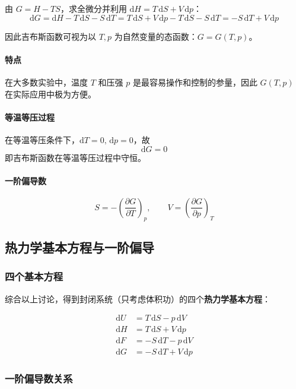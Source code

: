 \documentclass[UTF8]{ctexart}
\begin{document}
由 $G=H-TS$，求全微分并利用 $\mathrm{d}H=T\,\mathrm{d}S+V\,\mathrm{d}p$：
\[
\mathrm{d}G=\mathrm{d}H-T\,\mathrm{d}S-S\,\mathrm{d}T
=T\,\mathrm{d}S+V\,\mathrm{d}p-T\,\mathrm{d}S-S\,\mathrm{d}T
=-S\,\mathrm{d}T+V\,\mathrm{d}p
\]

因此吉布斯函数可视为以 $T,p$ 为自然变量的态函数：$G=G(T,p)$。

\paragraph{特点}
在大多数实验中，温度 $T$ 和压强 $p$ 是最容易操作和控制的参量，因此 $G(T,p)$ 在实际应用中极为方便。

\paragraph{等温等压过程}
在等温等压条件下，$\mathrm{d}T=0,\,\mathrm{d}p=0$，故
\[
\boxed{\mathrm{d}G=0}
\]
即吉布斯函数在等温等压过程中守恒。

\paragraph{一阶偏导数}
\[
S=-\left(\frac{\partial G}{\partial T}\right)_p,\qquad
V=\left(\frac{\partial G}{\partial p}\right)_T
\]


\subsection{热力学基本方程与一阶偏导}

\subsubsection{四个基本方程}

综合以上讨论，得到封闭系统（只考虑体积功）的四个\textbf{热力学基本方程}：

\begin{align}
\mathrm{d}U &= T\,\mathrm{d}S-p\,\mathrm{d}V \tag{1}\\[4pt]
\mathrm{d}H &= T\,\mathrm{d}S+V\,\mathrm{d}p \tag{2}\\[4pt]
\mathrm{d}F &= -S\,\mathrm{d}T-p\,\mathrm{d}V \tag{3}\\[4pt]
\mathrm{d}G &= -S\,\mathrm{d}T+V\,\mathrm{d}p \tag{4}
\end{align}

\subsubsection{一阶偏导数关系}
\end{document}
